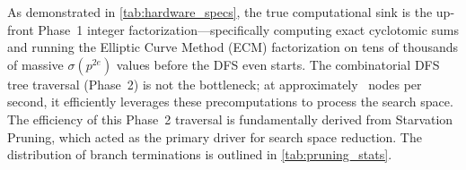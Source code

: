 \begin{table}[htbp]
    \centering
    \caption{Hardware Specifications and Monolithic Search Telemetry.}
    \label{tab:hardware_specs}
\end{table}

As demonstrated in \cref{tab:hardware_specs}, the true computational sink
is the up-front Phase~1 integer factorization---specifically computing exact
cyclotomic sums and running the Elliptic Curve Method (ECM) factorization on
tens of thousands of massive $\sigma(p^{2e})$ values before the DFS even starts.
The combinatorial DFS tree traversal (Phase~2) is not the bottleneck; at approximately
\TelemetryNodesPerSec\ nodes per second, it efficiently leverages these precomputations
to process the search space. The efficiency of this Phase~2 traversal is
fundamentally derived from Starvation Pruning, which acted as the
primary driver for search space reduction.  The distribution of branch
terminations is outlined in \cref{tab:pruning_stats}.

\begin{table}[htbp]
  \centering
  \caption{Distribution of topological branch pruning strategies across
           DFS execution (Total branches pruned: \TelemetryPruned).}
  \label{tab:pruning_stats}
\end{table}

